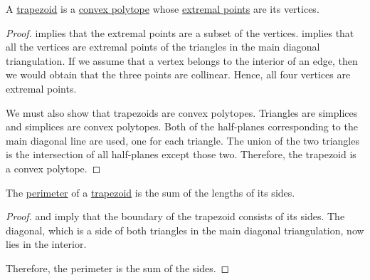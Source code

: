 \begin{proposition}\label{thm:trapezoid_is_polytope}
  A \hyperref[def:trapezoid]{trapezoid} is a \hyperref[def:convex_polytope]{convex polytope} whose \hyperref[def:extremal_point]{extremal points} are its vertices.
\end{proposition}
\begin{proof}
   implies that the extremal points are a subset of the vertices.  implies that all the vertices are extremal points of the triangles in the main diagonal triangulation. If we assume that a vertex belongs to the interior of an edge, then we would obtain that the three points are collinear. Hence, all four vertices are extremal points.

  We must also show that trapezoids are convex polytopes. Triangles are simplices and simplices are convex polytopes. Both of the half-planes corresponding to the main diagonal line are used, one for each triangle. The union of the two triangles is the intersection of all half-planes except those two. Therefore, the trapezoid is a convex polytope.
\end{proof}

\begin{proposition}\label{thm:perimeter_of_trapezoid}
  The \hyperref[def:perimeter]{perimeter} of a \hyperref[def:trapezoid]{trapezoid} is the sum of the lengths of its sides.
\end{proposition}
\begin{proof}
   and  imply that the boundary of the trapezoid consists of its sides. The diagonal, which is a side of both triangles in the main diagonal triangulation, now lies in the interior.

  Therefore, the perimeter is the sum of the sides.
\end{proof}

